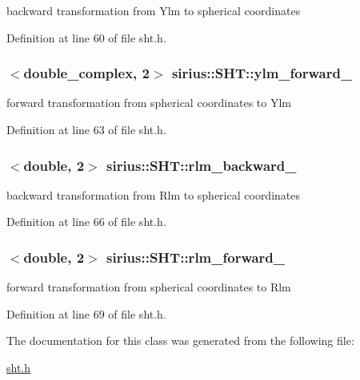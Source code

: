 backward transformation from Ylm to spherical coordinates 



Definition at line 60 of file sht.\+h.

\hypertarget{classsirius_1_1_s_h_t_a2a7d448857ccb43d7a7a4cf5c1b1de40}{}
\subsubsection[{ylm\+\_\+forward\+\_\+}]{$<$double\+\_\+complex, 2$>$ sirius\+::\+S\+H\+T\+::ylm\+\_\+forward\+\_\+\hspace{0.3cm}{\ttfamily [private]}}\label{classsirius_1_1_s_h_t_a2a7d448857ccb43d7a7a4cf5c1b1de40}


forward transformation from spherical coordinates to Ylm 



Definition at line 63 of file sht.\+h.

\hypertarget{classsirius_1_1_s_h_t_a63ed79c5a767d8c0f950f46a736e6281}{}
\subsubsection[{rlm\+\_\+backward\+\_\+}]{$<$double, 2$>$ sirius\+::\+S\+H\+T\+::rlm\+\_\+backward\+\_\+\hspace{0.3cm}{\ttfamily [private]}}\label{classsirius_1_1_s_h_t_a63ed79c5a767d8c0f950f46a736e6281}


backward transformation from Rlm to spherical coordinates 



Definition at line 66 of file sht.\+h.

\hypertarget{classsirius_1_1_s_h_t_a9bf2864722425da105299d52cb93dba8}{}
\subsubsection[{rlm\+\_\+forward\+\_\+}]{$<$double, 2$>$ sirius\+::\+S\+H\+T\+::rlm\+\_\+forward\+\_\+\hspace{0.3cm}{\ttfamily [private]}}\label{classsirius_1_1_s_h_t_a9bf2864722425da105299d52cb93dba8}


forward transformation from spherical coordinates to Rlm 



Definition at line 69 of file sht.\+h.



The documentation for this class was generated from the following file\+:\begin{DoxyCompactItemize}
\item 
\hyperlink{sht_8h}{sht.\+h}\end{DoxyCompactItemize}
